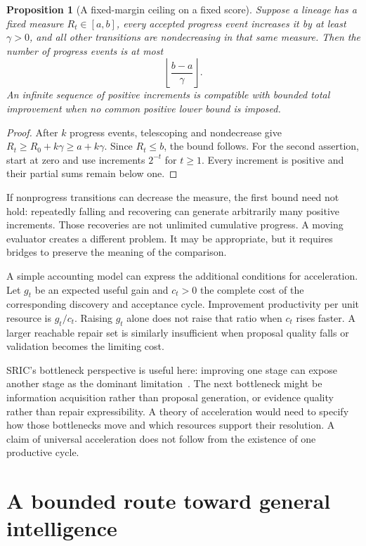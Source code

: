 \documentclass[11pt,letterpaper]{article}
\theoremstyle{plain}
\newtheorem{proposition}[theorem]{Proposition}
\theoremstyle{definition}
\begin{document}
\begin{proposition}[A fixed-margin ceiling on a fixed score]\label{prop:ceiling}
Suppose a lineage has a fixed measure $R_t\in[a,b]$, every accepted progress event increases it by at least $\gamma>0$, and all other transitions are nondecreasing in that same measure. Then the number of progress events is at most
\[
\left\lfloor\frac{b-a}{\gamma}\right\rfloor.
\]
An infinite sequence of positive increments is compatible with bounded total improvement when no common positive lower bound is imposed.
\end{proposition}
\begin{proof}
After $k$ progress events, telescoping and nondecrease give $R_t\geq R_0+k\gamma\geq a+k\gamma$. Since $R_t\leq b$, the bound follows. For the second assertion, start at zero and use increments $2^{-t}$ for $t\geq1$. Every increment is positive and their partial sums remain below one.
\end{proof}

If nonprogress transitions can decrease the measure, the first bound need not hold: repeatedly falling and recovering can generate arbitrarily many positive increments. Those recoveries are not unlimited cumulative progress. A moving evaluator creates a different problem. It may be appropriate, but it requires bridges to preserve the meaning of the comparison.

A simple accounting model can express the additional conditions for acceleration. Let $g_t$ be an expected useful gain and $c_t>0$ the complete cost of the corresponding discovery and acceptance cycle. Improvement productivity per unit resource is $g_t/c_t$. Raising $g_t$ alone does not raise that ratio when $c_t$ rises faster. A larger reachable repair set is similarly insufficient when proposal quality falls or validation becomes the limiting cost.

SRIC's bottleneck perspective is useful here: improving one stage can expose another stage as the dominant limitation~\cite{sric}. The next bottleneck might be information acquisition rather than proposal generation, or evidence quality rather than repair expressibility. A theory of acceleration would need to specify how those bottlenecks move and which resources support their resolution. A claim of universal acceleration does not follow from the existence of one productive cycle.


\clearpage\part{A bounded route toward general intelligence}
\end{document}
